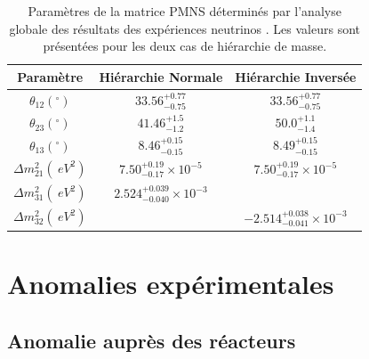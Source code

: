 \begin{table}[h!]
\begin{center}
\begin{tabular}{|c|c|c|}
\hline
Paramètre & Hiérarchie Normale & Hiérarchie Inversée \\
\hline
$\theta_{12} (^\circ)$ & $33.56^{+0.77}_{-0.75}$ & $33.56^{+0.77}_{-0.75}$\\
\hline
$\theta_{23} (^\circ)$ & $41.46^{+1.5}_{-1.2}$ & $50.0^{+1.1}_{-1.4}$\\
\hline
$\theta_{13} (^\circ)$ & $8.46^{+0.15}_{-0.15}$ & $8.49^{+0.15}_{-0.15}$\\
\hline
$\Delta m^2_{21} (\SI{}{eV^2})$ & $7.50^{+0.19}_{-0.17} \times 10^{-5}$ & $7.50^{+0.19}_{-0.17} \times 10^{-5}$\\
\hline
$\Delta m^2_{31} (\SI{}{eV^2})$ & $2.524^{+0.039}_{-0.040} \times 10^{-3}$ & \\
\hline
$\Delta m^2_{32} (\SI{}{eV^2})$ & & $-2.514^{+0.038}_{-0.041} \times 10^{-3}$\\
\hline
\end{tabular}
\caption[Paramètres de la matrice PMNS déterminés par l'analyse globale des résultats des expériences neutrinos]{Paramètres de la matrice PMNS déterminés par l'analyse globale des résultats des expériences neutrinos \cite{Esteban2017}. Les valeurs sont présentées pour les deux cas de hiérarchie de masse.}
\label{tab:global_fit_PMNS}
\end{center}
\end{table}

%

\bigbreak

\section{Anomalies expérimentales}

\subsection{Anomalie auprès des réacteurs}
\label{sec:anomaly_reacteur}

